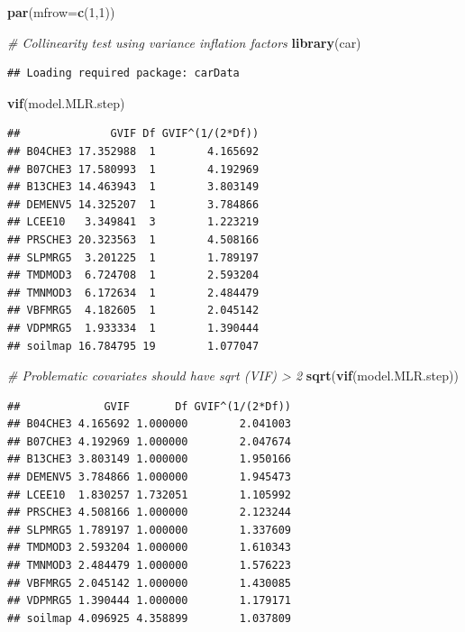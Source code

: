 \documentclass[10pt,b5paper,]{book}
\newenvironment{Shaded}{\begin{snugshade}}{\end{snugshade}}
\newcommand{\CommentTok}[1]{\textcolor[rgb]{0.56,0.35,0.01}{\textit{#1}}}
\newcommand{\DataTypeTok}[1]{\textcolor[rgb]{0.13,0.29,0.53}{#1}}
\newcommand{\DecValTok}[1]{\textcolor[rgb]{0.00,0.00,0.81}{#1}}
\newcommand{\KeywordTok}[1]{\textcolor[rgb]{0.13,0.29,0.53}{\textbf{#1}}}
\newcommand{\NormalTok}[1]{#1}
\theoremstyle{definition}
\theoremstyle{definition}
\theoremstyle{definition}
\theoremstyle{remark}
\begin{document}
\begin{Shaded}
\begin{Highlighting}[]
\KeywordTok{par}\NormalTok{(}\DataTypeTok{mfrow=}\KeywordTok{c}\NormalTok{(}\DecValTok{1}\NormalTok{,}\DecValTok{1}\NormalTok{))}
\end{Highlighting}
\end{Shaded}

 

\begin{Shaded}
\begin{Highlighting}[]
\CommentTok{# Collinearity test using variance inflation factors}
\KeywordTok{library}\NormalTok{(car)}
\end{Highlighting}
\end{Shaded}

\begin{verbatim}
## Loading required package: carData
\end{verbatim}

\begin{Shaded}
\begin{Highlighting}[]
\KeywordTok{vif}\NormalTok{(model.MLR.step)}
\end{Highlighting}
\end{Shaded}

\begin{verbatim}
##              GVIF Df GVIF^(1/(2*Df))
## B04CHE3 17.352988  1        4.165692
## B07CHE3 17.580993  1        4.192969
## B13CHE3 14.463943  1        3.803149
## DEMENV5 14.325207  1        3.784866
## LCEE10   3.349841  3        1.223219
## PRSCHE3 20.323563  1        4.508166
## SLPMRG5  3.201225  1        1.789197
## TMDMOD3  6.724708  1        2.593204
## TMNMOD3  6.172634  1        2.484479
## VBFMRG5  4.182605  1        2.045142
## VDPMRG5  1.933334  1        1.390444
## soilmap 16.784795 19        1.077047
\end{verbatim}

\begin{Shaded}
\begin{Highlighting}[]
\CommentTok{# Problematic covariates should have sqrt (VIF) > 2}
\KeywordTok{sqrt}\NormalTok{(}\KeywordTok{vif}\NormalTok{(model.MLR.step))}
\end{Highlighting}
\end{Shaded}

\begin{verbatim}
##             GVIF       Df GVIF^(1/(2*Df))
## B04CHE3 4.165692 1.000000        2.041003
## B07CHE3 4.192969 1.000000        2.047674
## B13CHE3 3.803149 1.000000        1.950166
## DEMENV5 3.784866 1.000000        1.945473
## LCEE10  1.830257 1.732051        1.105992
## PRSCHE3 4.508166 1.000000        2.123244
## SLPMRG5 1.789197 1.000000        1.337609
## TMDMOD3 2.593204 1.000000        1.610343
## TMNMOD3 2.484479 1.000000        1.576223
## VBFMRG5 2.045142 1.000000        1.430085
## VDPMRG5 1.390444 1.000000        1.179171
## soilmap 4.096925 4.358899        1.037809
\end{verbatim}
\end{document}
